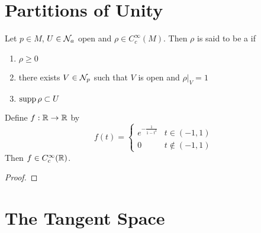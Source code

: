 \documentclass{book}
\begin{document}
\newpage 
\section{Partitions of Unity}
	
	\begin{defn}
	Let $p \in M$, $U \in \mathcal{N}_a$ open and $\rho \in C_c^{\infty}(M)$. Then $\rho$ is said to be a  if 
	\begin{enumerate}
	\item $\rho \geq 0$ 
	\item there exists $V \in \mathcal{N}_p$ such that $V$ is open and $\rho|_V = 1$ 
	\item $\operatorname{supp} \rho \subset U$
	\end{enumerate}
	\end{defn}
	
	\begin{ex}
	Define $f:\mathbb{R} \rightarrow \mathbb{R}$ by 
	\[
	f(t) = 
	\begin{cases}
	e^{-\frac{1}{1-t^2}} & t \in (-1,1)\\
	0 &  t \not \in (-1,1)
	\end{cases}
	\]
	Then $f \in C_c^{\infty}(\mathbb{R})$.
	\end{ex}
	
	\begin{proof}
	
	\end{proof}
	
	
















	\newpage
	\section{The Tangent Space}

\end{document}
